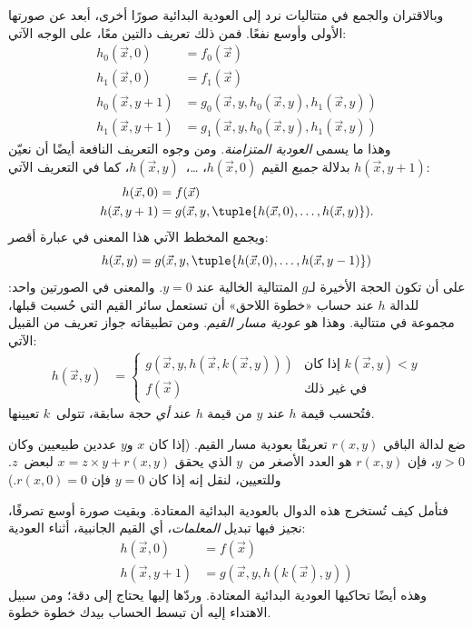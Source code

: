\documentclass[../../../include/open-logic-section]{subfiles}
\begin{document}

وبالاقتران والجمع في متتاليات نرد إلى العودية البدائية صورًا أخرى،
أبعد عن صورتها الأولى وأوسع نفعًا. فمن ذلك تعريف دالتين معًا،
على الوجه الآتي:
\begin{align*}
h_0(\vec x, 0) & = f_0(\vec x) \\
h_1(\vec x, 0) & = f_1(\vec x) \\
h_0(\vec x, y+1) & = g_0(\vec x, y, h_0(\vec x, y), h_1(\vec x, y)) \\
h_1(\vec x, y+1) & = g_1(\vec x, y, h_0(\vec x, y), h_1(\vec x, y))
\end{align*}
وهذا ما يسمى \emph{العودية المتزامنة}. ومن وجوه التعريف النافعة أيضًا
أن نعيّن $h(\vec x,y+1)$ بدلالة \emph{جميع} القيم
$h(\vec x,0)$، …،~$h(\vec x,y)$، كما في التعريف الآتي:
\begin{align*}
h(\vec x, 0) & = f(\vec x) \\
h(\vec x, y+1) & = g(\vec x, y, \tuple{h(\vec x, 0), \dots, h(\vec x, y)}).
\end{align*}
ويجمع المخطط الآتي هذا المعنى في عبارة أقصر:
\[
h(\vec x, y) = g(\vec x, y, \tuple{h(\vec x, 0), \dots, h(\vec x, y-1)})
\]
على أن تكون الحجة الأخيرة لـ$g$ المتتالية الخالية عند
$y=0$. والمعنى في الصورتين واحد: للدالة $h$ عند حساب
«خطوة اللاحق» أن تستعمل سائر القيم التي حُسبت قبلها، مجموعة في متتالية.
وهذا هو \emph{عودية مسار القيم}. ومن تطبيقاته
جواز تعريف من القبيل الآتي:
\begin{align*}
h(\vec x, y) & = \begin{cases}
  g(\vec x, y, h(\vec x, k(\vec x, y))) & \text{إذا كان $k(\vec x, y) < y$} \\
  f(\vec x) & \text{في غير ذلك}
\end{cases}
\end{align*}
فتُحسب قيمة $h$ عند $y$ من قيمة $h$ عند
\emph{أي} حجة سابقة، تتولى~$k$ تعيينها.

\begin{prob}
  ضع لدالة الباقي $r(x,y)$ تعريفًا بعودية مسار القيم. (إذا كان $x$ و$y$
  عددين طبيعيين وكان $y>0$، فإن $r(x,y)$ هو العدد الأصغر من~$y$ الذي
  يحقق $x=z\times y+r(x,y)$ لبعض~$z$. وللتعيين، لنقل إنه إذا كان
  $y=0$ فإن $r(x,0)=0$.)
\end{prob}

فتأمل كيف تُستخرج هذه الدوال بالعودية البدائية
المعتادة. وبقيت صورة أوسع تصرفًا، نجيز فيها
تبديل \emph{المعلمات}، أي القيم الجانبية، أثناء العودية:
\begin{align*}
h(\vec x, 0) & = f(\vec x) \\
h(\vec x, y+1) & = g(\vec x, y, h(k(\vec x), y))
\end{align*}
وهذه أيضًا تحاكيها العودية البدائية المعتادة. وردّها إليها يحتاج إلى دقة؛
ومن سبيل الاهتداء إليه أن تبسط الحساب بيدك خطوة خطوة.
\end{document}
